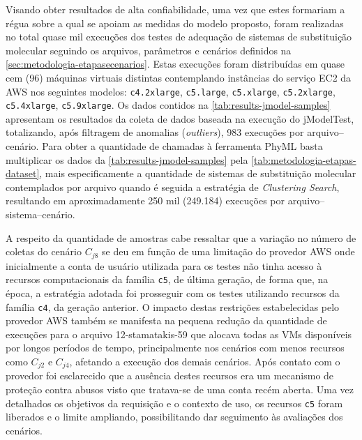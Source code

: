 \documentclass[english,brazilian]{UNISINOSmonografia} %
\begin{document}
Visando obter resultados de alta confiabilidade, uma vez que estes formariam a régua sobre a qual se apoiam as medidas do modelo proposto, foram realizadas no total quase mil execuções dos testes de adequação de sistemas de substituição molecular seguindo os arquivos, parâmetros e cenários definidos na \autoref{sec:metodologia-etapasecenarios}.
%
Estas execuções foram distribuídas em quase cem (96) máquinas virtuais distintas contemplando instâncias do serviço EC2 da AWS nos seguintes modelos: \texttt{c4.2xlarge}, \texttt{c5.large}, \texttt{c5.xlarge}, \texttt{c5.2xlarge}, \texttt{c5.4xlarge}, \texttt{c5.9xlarge}.
%
Os dados contidos na \autoref{tab:results-jmodel-samples} apresentam os resultados da coleta de dados baseada na execução do jModelTest, totalizando, após filtragem de anomalias (\textit{outliers}), 983 execuções por arquivo--cenário.
%
Para obter a quantidade de chamadas à ferramenta PhyML basta multiplicar os dados da \autoref{tab:results-jmodel-samples} pela \autoref{tab:metodologia-etapas-dataset}, mais especificamente a quantidade de sistemas de substituição molecular contemplados por arquivo quando é seguida a estratégia de \textit{Clustering Search}, resultando em aproximadamente 250 mil (249.184) execuções por arquivo--sistema--cenário.



A respeito da quantidade de amostras cabe ressaltar que a variação no número de coletas do cenário $C_{j8}$ se deu em função de uma limitação do provedor AWS onde inicialmente a conta de usuário utilizada para os testes não tinha acesso à recursos computacionais da família \texttt{c5}, de última geração, de forma que, na época, a estratégia adotada foi prosseguir com os testes utilizando recursos da família \texttt{c4}, da geração anterior.
%
O impacto destas restrições estabelecidas pelo provedor AWS também se manifesta na pequena redução da quantidade de execuções para o arquivo 12-stamatakis-59 que alocava todas as VMs disponíveis por longos períodos de tempo, principalmente nos cenários com menos recursos como $C_{j2}$ e $C_{j4}$, afetando a execução dos demais cenários.
%
Após contato com o provedor foi esclarecido que a ausência destes recursos era um mecanismo de proteção contra abusos visto que tratava-se de uma conta recém aberta.
%
Uma vez detalhados os objetivos da requisição e o contexto de uso, os recursos \texttt{c5} foram liberados e o limite ampliando, possibilitando dar seguimento às avaliações dos cenários.
\end{document}
